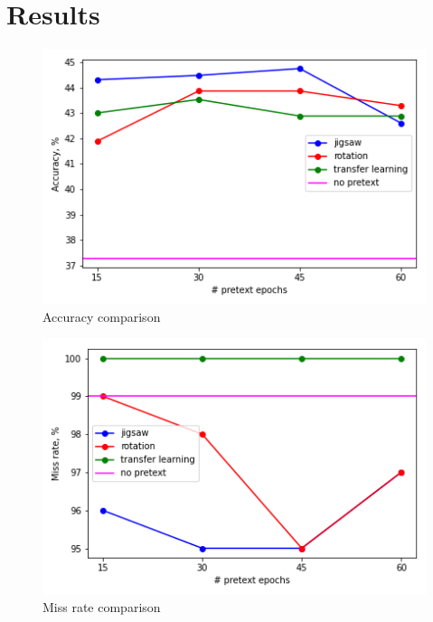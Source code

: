 \section{Results}

\begin{figure}
    \includegraphics{images/acc}
    \caption{\label{fig:figure-1}Accuracy comparison}
\end{figure}

\begin{figure}
    \includegraphics{images/miss}
    \caption{\label{fig:figure-2}Miss rate comparison}
\end{figure}



